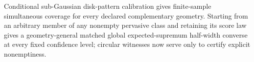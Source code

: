 Conditional sub-Gaussian disk-pattern calibration gives finite-sample simultaneous coverage for every declared complementary geometry. Starting from an arbitrary member of any nonempty pervasive class and retaining its score law gives a geometry-general matched global expected-supremum half-width converse at every fixed confidence level; circular witnesses now serve only to certify explicit nonemptiness.